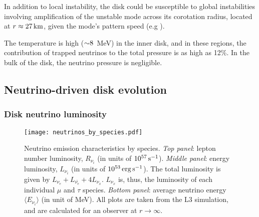 In addition to local instability, the disk could be susceptible to global
instabilities involving amplification of the unstable mode across its corotation
radius, located at $r \approx 27\rm\,km$, given the mode's pattern
speed (e.g \citealt{1985MNRAS.213..799P}).

The temperature is high ($\mathord{\sim} 8$~MeV) in the inner disk, and in these
regions, the contribution of trapped neutrinos to the total pressure is as
high as 12\%.  In the bulk of the disk, the neutrino pressure is
negligible.

\subsection{Neutrino-driven disk evolution}
\label{sec:neutrinodisk}

\subsubsection{Disk neutrino luminosity}

\begin{figure}
\texttt{[image: neutrinos\_by\_species.pdf]}
\caption{
Neutrino emission characteristics by species.
{\em Top panel}: lepton number luminosity, $R_{\nu_i}$
(in units of $10^{57}\rm\,s^{-1}$).
{\em Middle panel}: energy luminosity, $L_{\nu_i}$
(in units of $10^{53}\rm\,erg\,s^{-1}$).
The total luminosity is given by $L_{\nu_e}+L_{\bar{\nu_e}}+4L_{\nu_x}$. 
$L_{\nu_x}$ is, thus, the luminosity of each individual $\mu$ and $\tau$
species.
{\em Bottom panel}: average neutrino energy $\langle E_{\nu_i} \rangle$
(in unit of MeV).
All plots are taken from the L3 simulation, and are calculated for
an observer at $r \rightarrow \infty$.
}
\label{fig:neutrinos_by_species}
\end{figure}

